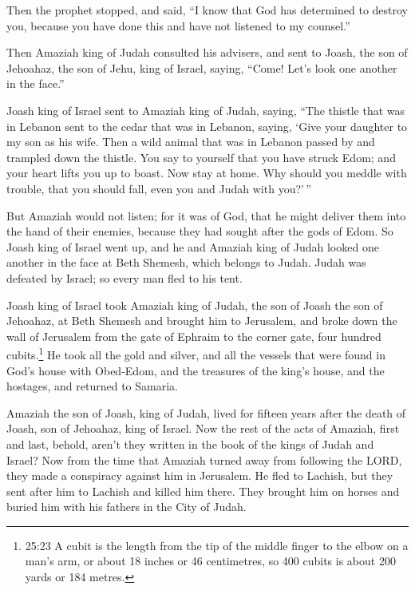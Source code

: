 Then the prophet stopped, and said, ``I know that God has determined to
destroy you, because you have done this and have not listened to my
counsel.''

 Then Amaziah king of Judah consulted his advisers, and
sent to Joash, the son of Jehoahaz, the son of Jehu, king of Israel,
saying, ``Come! Let's look one another in the face.''

 Joash king of Israel sent to Amaziah king of Judah,
saying, ``The thistle that was in Lebanon sent to the cedar that was in
Lebanon, saying, `Give your daughter to my son as his wife. Then a wild
animal that was in Lebanon passed by and trampled down the thistle.
 You say to yourself that you have struck Edom; and your
heart lifts you up to boast. Now stay at home. Why should you meddle
with trouble, that you should fall, even you and Judah with you?'\,''

 But Amaziah would not listen; for it was of God, that he
might deliver them into the hand of their enemies, because they had
sought after the gods of Edom.  So Joash king of Israel
went up, and he and Amaziah king of Judah looked one another in the face
at Beth Shemesh, which belongs to Judah.  Judah was
defeated by Israel; so every man fled to his tent.

 Joash king of Israel took Amaziah king of Judah, the son
of Joash the son of Jehoahaz, at Beth Shemesh and brought him to
Jerusalem, and broke down the wall of Jerusalem from the gate of Ephraim
to the corner gate, four hundred cubits.\footnote{25:23 A cubit is the
  length from the tip of the middle finger to the elbow on a man's arm,
  or about 18 inches or 46 centimetres, so 400 cubits is about 200 yards
  or 184 metres.}  He took all the gold and silver, and all
the vessels that were found in God's house with Obed-Edom, and the
treasures of the king's house, and the hostages, and returned to
Samaria.

 Amaziah the son of Joash, king of Judah, lived for fifteen
years after the death of Joash, son of Jehoahaz, king of Israel.
 Now the rest of the acts of Amaziah, first and last,
behold, aren't they written in the book of the kings of Judah and
Israel?  Now from the time that Amaziah turned away from
following the LORD, they made a conspiracy against him in Jerusalem. He
fled to Lachish, but they sent after him to Lachish and killed him
there.  They brought him on horses and buried him with his
fathers in the City of Judah.

